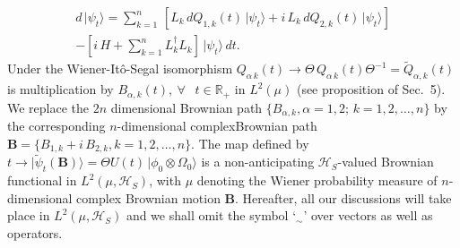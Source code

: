 \begin{multline}
d\,\vert\psi_t\rangle =\sum_{k=1}^{n}\, \left[L_k\,  dQ_{1,k}(t)\, \vert\psi_t\rangle 
+ i\,L_k\,  dQ_{2,k}(t)\, \vert\psi_t\rangle\right]\\  
-\left[i\, H+\sum_{k=1}^{n}L^\dag_k L_k \right] \, \vert\psi_t\rangle\, dt.\label{chap8-eq6.5}
\end{multline}  
Under the Wiener-It{\^o}-Segal isomorphism  $Q_{\alpha\,k}(t)\rightarrow \Theta\, Q_{\alpha\,k}(t)\Theta^{-1}=\widetilde{Q}_{\alpha,k}(t)$ is multiplication by  $B_{\alpha,k}(t),\ \forall \ \ \,\, t\in\mathbb{R}_+$ in  $L^2(\mu)$ (see proposition of Sec.\ 5). We replace  the $2n$ dimensional Brownian path $\{B_{\alpha,k}, \alpha=1,2;\, k=1,2,\ldots, n\}$  by the corresponding $n$-dimensional complex\break Brownian path $\mathbf{B}=\{B_{1,k}+i\,B_{2,k},k=1,2,\ldots , n\}.$ The map defined by  $t\rightarrow \vert\widetilde{\psi}_t(\mathbf{B})\rangle= \Theta U(t)\, \vert\phi_0\otimes \Omega_0\rangle$ is a non-anticipating $\mathcal{H}_S$-valued Brownian functional in $L^2(\mu, \mathcal{H}_S)$, with $\mu$ denoting the Wiener probability measure of $n$-dimensional complex Brownian motion $\mathbf{B}$. Hereafter, all our discussions will take place in $L^2(\mu, \mathcal{H}_S)$ and we shall omit the symbol `${}_{\sim}$' over vectors as well as operators.  

